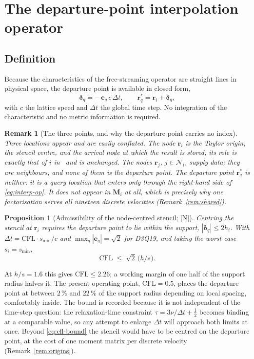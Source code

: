 \documentclass[11pt,a4paper]{article}
\newcommand{\New}{\textcolor{blue!60!black}{\textsf{[N]}}}
\newtheorem{proposition}{Proposition}
\newtheorem{remark}{Remark}
\begin{document}
\section{The departure-point interpolation operator}
\label{sec:interp}

\subsection{Definition}

Because the characteristics of the free-streaming operator are straight lines in
physical space, the departure point is available in closed form,
\begin{equation}
\bm\delta_q=-\,\bm e_q\,c\,\Delta t,
\qquad
\bm r^{*}_q=\bm r_i+\bm\delta_q ,
\label{eq:departure}
\end{equation}
with $c$ the lattice speed and $\Delta t$ the global time step. No integration of the
characteristic and no metric information is required.

\begin{remark}[The three points, and why the departure point carries no index]
\label{rem:threepoints}
Three locations appear and are easily conflated. The node $\bm r_i$ is the Taylor
origin, the stencil centre, and the arrival node at which the result is stored; its
role is exactly that of $i$ in~\cite{KLN2020} and is unchanged. The nodes $\bm r_j$,
$j\in\mathcal N_i$, supply data; they are neighbours, and \emph{none of them is the
departure point}. The departure point $\bm r^{*}_q$ is neither: it is a query location
that enters only through the right-hand side of \eqref{eq:interp-op}. It does not
appear in $\bm M_i$ at all, which is precisely why one factorisation serves all
nineteen discrete velocities (Remark~\ref{rem:shared}).
\end{remark}

\begin{proposition}[Admissibility of the node-centred stencil; \New]
\label{prop:cfl}
Centring the stencil at $\bm r_i$ requires the departure point to lie within the
support, $|\bm\delta_q|\le2h_i$. With $\Delta t=\mathrm{CFL}\cdot s_{\min}/c$ and
$\max_q|\bm e_q|=\sqrt2$ for D3Q19, and taking the worst case $s_i=s_{\min}$,
\begin{equation}
\mathrm{CFL}\;\le\;\sqrt2\,\bigl(h/s\bigr).
\label{eq:cfl-bound}
\end{equation}
\end{proposition}
\noindent At $h/s=1.6$ this gives $\mathrm{CFL}\le2.26$; a working margin of one half of
the support radius halves it. The present operating point, $\mathrm{CFL}=0.5$, places
the departure point at between $2\,\%$ and $22\,\%$ of the support radius depending on
local spacing, comfortably inside. The bound is recorded because it is not independent
of the time-step question: the relaxation-time constraint
$\tau=3\nu/\Delta t+\tfrac12$ becomes binding at a comparable value, so any attempt to
enlarge $\Delta t$ will approach both limits at once. Beyond \eqref{eq:cfl-bound} the
stencil would have to be centred on the departure point, at the cost of one moment
matrix per discrete velocity (Remark~\ref{rem:origins}).
\end{document}
